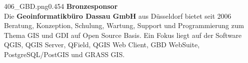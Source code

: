 \sponsorBoxA{}406_GBD.png{0.45\textwidth}{4}{%
\textbf{Bronzesponsor}\\
\noindent\small Die {\bfseries Geoinformatikbüro Dassau GmbH} aus Düsseldorf bietet seit 2006 Beratung, Konzeption, Schulung, Wartung, Support und Programmierung zum Thema GIS und GDI auf Open Source Basis. Ein Fokus liegt auf der Software QGIS, QGIS Server, QField, QGIS Web Client, GBD WebSuite, PostgreSQL/PostGIS und GRASS GIS.
\normalsize
}%
